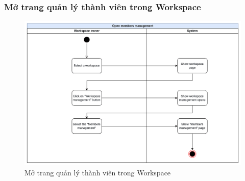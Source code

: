 \subsubsection{Mở trang quản lý thành viên trong Workspace}
    \begin{figure}[H]
        \centering
        \includegraphics[width=\linewidth]{Content/Phân tích và thiết kế hệ thống/documents/Sơ đồ hoạt động/images/openMemberManagement.png}
        \vspace{0.5cm}
        \caption{Mở trang quản lý thành viên trong Workspace}
        \label{fig:Mở trang quản lý thành viên trong Workspace}
    \end{figure}